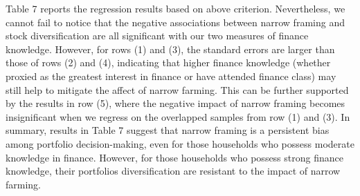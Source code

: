 \documentclass[ukenglish,nottitlepage,thmsb,11pt,letterpaper]{article}
\begin{document}
Table 7 reports the regression results based on above criterion. Nevertheless, we cannot fail to notice that the negative associations between narrow framing and stock diversification are all significant with our two measures of finance knowledge. However, for rows (1) and (3), the standard errors are larger than those of rows (2) and (4), indicating that higher finance knowledge (whether proxied as the greatest interest in finance or have attended finance class) may still help to mitigate the affect of narrow farming. This can be further supported by the results in row (5), where the negative impact of narrow framing becomes insignificant when we regress on the overlapped samples from row (1) and (3). In summary, results in Table 7 suggest that narrow framing is a persistent bias among portfolio decision-making, even for those households who possess moderate knowledge in finance. However, for those households who possess strong finance knowledge, their portfolios diversification are resistant to the impact of narrow farming. 
\end{document}
